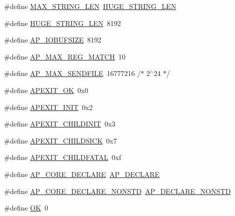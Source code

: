 \begin{DoxyCompactItemize}
\item 
\#define \hyperlink{group__APACHE__CORE__DAEMON_ga4fa9aad0e9c7cc2e344b679cdbb2b67d}{M\+A\+X\+\_\+\+S\+T\+R\+I\+N\+G\+\_\+\+L\+EN}~\hyperlink{group__apr__lib_ga0c9dd98f46b90b5bcd4cbf75e252d0da}{H\+U\+G\+E\+\_\+\+S\+T\+R\+I\+N\+G\+\_\+\+L\+EN}
\item 
\#define \hyperlink{group__APACHE__CORE__DAEMON_ga0c9dd98f46b90b5bcd4cbf75e252d0da}{H\+U\+G\+E\+\_\+\+S\+T\+R\+I\+N\+G\+\_\+\+L\+EN}~8192
\item 
\#define \hyperlink{group__APACHE__CORE__DAEMON_ga6be89020c751a112c553c200335a2fff}{A\+P\+\_\+\+I\+O\+B\+U\+F\+S\+I\+ZE}~8192
\item 
\#define \hyperlink{group__APACHE__CORE__DAEMON_ga7cc324c99d14a68ba7c8d1aae306a8d8}{A\+P\+\_\+\+M\+A\+X\+\_\+\+R\+E\+G\+\_\+\+M\+A\+T\+CH}~10
\item 
\#define \hyperlink{group__APACHE__CORE__DAEMON_ga9eac925b49a5ba9d68f29b6c93e3e1e5}{A\+P\+\_\+\+M\+A\+X\+\_\+\+S\+E\+N\+D\+F\+I\+LE}~16777216  /$\ast$ 2$^\wedge$24 $\ast$/
\item 
\#define \hyperlink{group__APACHE__CORE__DAEMON_ga2397a8dff5b05e1856799982519a8c97}{A\+P\+E\+X\+I\+T\+\_\+\+OK}~0x0
\item 
\#define \hyperlink{group__APACHE__CORE__DAEMON_ga24875285f74462463d2ba76bc3ff64b8}{A\+P\+E\+X\+I\+T\+\_\+\+I\+N\+IT}~0x2
\item 
\#define \hyperlink{group__APACHE__CORE__DAEMON_gac7e17446142d98480983c42cad11b216}{A\+P\+E\+X\+I\+T\+\_\+\+C\+H\+I\+L\+D\+I\+N\+IT}~0x3
\item 
\#define \hyperlink{group__APACHE__CORE__DAEMON_gaa1491b2252978d25f8bc8c5897f5f1b7}{A\+P\+E\+X\+I\+T\+\_\+\+C\+H\+I\+L\+D\+S\+I\+CK}~0x7
\item 
\#define \hyperlink{group__APACHE__CORE__DAEMON_gaded5da364cad9d77f9c3dae73bd1d4bf}{A\+P\+E\+X\+I\+T\+\_\+\+C\+H\+I\+L\+D\+F\+A\+T\+AL}~0xf
\item 
\#define \hyperlink{group__APACHE__CORE__DAEMON_gab4a5c9c13f1c0b497077936112e5aae0}{A\+P\+\_\+\+C\+O\+R\+E\+\_\+\+D\+E\+C\+L\+A\+RE}~\hyperlink{group__hooks_ga2991c49e63464ffbc0a6d82f1878f0cd}{A\+P\+\_\+\+D\+E\+C\+L\+A\+RE}
\item 
\#define \hyperlink{group__APACHE__CORE__DAEMON_gaf178f9ed5d434562c006bcf49d210b2d}{A\+P\+\_\+\+C\+O\+R\+E\+\_\+\+D\+E\+C\+L\+A\+R\+E\+\_\+\+N\+O\+N\+S\+TD}~\hyperlink{vhost_8c_a3c3d35fe71135329f5cf444e02610da7}{A\+P\+\_\+\+D\+E\+C\+L\+A\+R\+E\+\_\+\+N\+O\+N\+S\+TD}
\item 
\#define \hyperlink{group__APACHE__CORE__DAEMON_gaba51915c87d64af47fb1cc59348961c9}{OK}~0

\end{DoxyCompactItemize}

